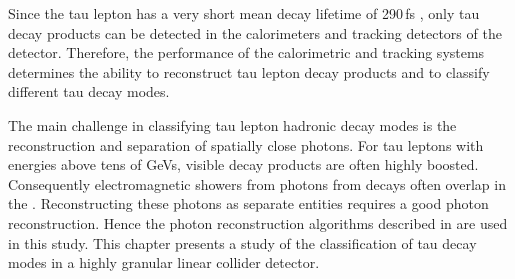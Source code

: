 Since the tau lepton has a very short mean decay lifetime of 290\,fs \cite{Abreu:1991jn}, only tau decay products can be detected in the calorimeters and tracking detectors of the \ILD detector. Therefore, the performance of the calorimetric and tracking systems determines the ability to reconstruct tau lepton decay products and to classify different tau decay modes.


The main challenge in classifying tau lepton hadronic decay modes  is the reconstruction and  separation of spatially close photons. For  tau leptons with energies above tens of GeVs, visible decay products are often highly boosted. Consequently electromagnetic showers from photons from \Ppizero decays often overlap in the \ECAL.  Reconstructing these photons as separate entities requires a good photon reconstruction. Hence the photon reconstruction algorithms described in  are used in this study. This chapter presents a study of the classification of tau decay modes in a highly granular linear collider detector.







%



